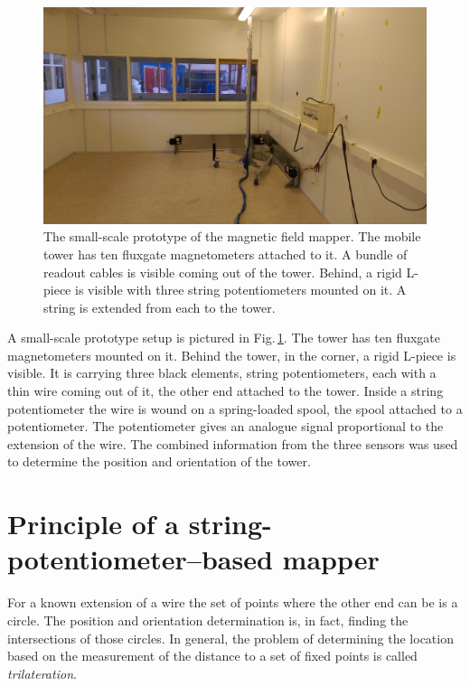 \begin{figure}
  \centering
  \includegraphics[width=\linewidth]{gfx/mapping/lpsc/setup.jpg}
  \caption{The small-scale prototype of the magnetic field mapper. The mobile tower has ten fluxgate magnetometers attached to it. A bundle of readout cables is visible coming out of the tower. Behind, a rigid L-piece is visible with three string potentiometers mounted on it. A string is extended from each to the tower. }\label{fig:mapping_bastille_setup}
\end{figure}

A small-scale prototype setup is pictured in Fig.\,\ref{fig:mapping_bastille_setup}. The tower
has ten fluxgate magnetometers mounted on it. Behind the tower, in the corner, a rigid L-piece is visible. 
It is carrying three black elements, string potentiometers, each with a thin wire coming out of it, the other end attached to the tower. Inside a string potentiometer the wire is wound on a spring-loaded spool, the spool attached to a potentiometer.
The potentiometer gives an analogue signal proportional to the extension of the wire. The combined information from the three sensors was used to determine the position and orientation of the tower.



\section{Principle of a string-potentiometer--based mapper}
For a known extension of a wire the set of points where the other end can be is a circle. The position and orientation determination is, in fact, finding the intersections of those circles.
In general, the problem of determining the location based on the measurement of the distance to a set of fixed points is called \emph{trilateration}.

